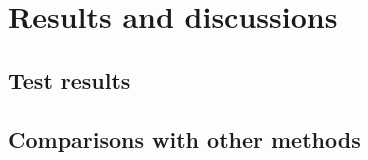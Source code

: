 \section{Results and discussions}

\subsection{Test results}

\subsection{Comparisons with other methods}